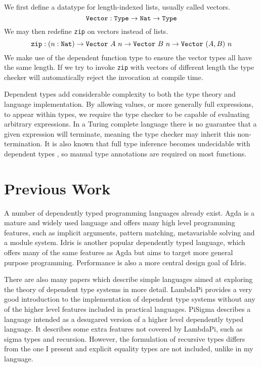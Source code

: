 \documentclass[12pt,a4paper,twoside]{report}
\begin{document}
We first define a datatype for length-indexed lists, usually called vectors.
\[
    \texttt{Vector} : \mathtt{Type} \rightarrow \texttt{Nat} \rightarrow \mathtt{Type}
\]
We may then redefine \texttt{zip} on vectors instead of lists.
\[
    \texttt{zip} : (n : \texttt{Nat}) \rightarrow \texttt{Vector}\ A\ n \rightarrow \texttt{Vector}\ B\ n \rightarrow \texttt{Vector}\ (A, B)\ n
\]
We make use of the dependent function type to ensure the vector types all have the same length.
If we try to invoke \texttt{zip} with vectors of different length the type checker will automatically reject the invocation at compile time.

Dependent types add considerable complexity to both the type theory and language implementation.
By allowing values, or more generally full expressions, to appear within types, we require the type checker to be capable of evaluating arbitrary expressions.
In a Turing complete language there is no guarantee that a given expression will terminate, meaning the type checker may inherit this non-termination.
It is also known that full type inference becomes undecidable with dependent types \cite{gilles93}, so manual type annotations are required on most functions.

\section{Previous Work}

A number of dependently typed programming languages already exist.
Agda \cite{norell07} is a mature and widely used language and offers many high level programming features, such as implicit arguments, pattern matching, metavariable solving and a module system.
Idris \cite{brady13} is another popular dependently typed language, which offers many of the same features as Agda but aims to target more general purpose programming.
Performance is also a more central design goal of Idris.

There are also many papers which describe simple languages aimed at exploring the theory of dependent type systems in more detail.
LambdaPi \cite{loeh10} provides a very good introduction to the implementation of dependent type systems without any of the higher level features included in practical languages.
PiSigma \cite{thorsten10} describes a language intended as a desugared version of a higher level dependently typed language.
It describes some extra features not covered by LambdaPi, such as sigma types and recursion.
However, the formulation of recursive types differs from the one I present and explicit equality types are not included, unlike in my language.
\end{document}
